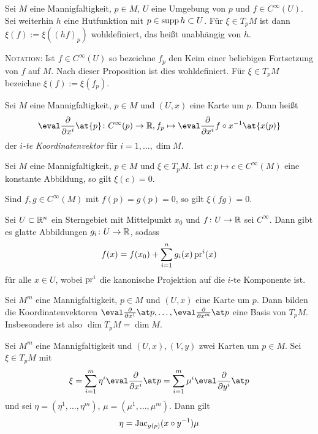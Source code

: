 \begin{proposition}
  Sei $M$ eine Mannigfaltigkeit, $p\in M$, $U$ eine Umgebung von $p$
  und $f\in C^\infty(U)$. Sei weiterhin $h$ eine Hutfunktion mit $p
  \in \operatorname{supp} h \subset U$. Für $\xi \in T_pM$ ist dann $\xi(f) := \xi((hf)_p)$
  wohldefiniert, das heißt unabhängig von $h$.

  \textsc{Notation:} Ist $f\in C^\infty(U)$ so bezeichne $f_p$ den
  Keim einer beliebigen Fortsetzung von $f$ auf $M$. Nach dieser
  Proposition ist dies wohldefiniert. Für $\xi \in T_pM$ bezeichne $\xi(f) := \xi(f_p)$.
\end{proposition}

\begin{definition}
  Sei $M$ eine Mannigfaltigkeit, $p\in M$ und $(U,x)$ eine Karte um
  $p$. Dann heißt
  \begin{equation*}
    \eval \deldelxi \at{p}\colon C^\infty(p) \to \R, f_p \mapsto \eval
    \deldelxi f\circ x^{-1}\at{x(p)}
  \end{equation*}
  der \emph{$i$-te Koordinatenvektor} für $i = 1,\dots,\dim M$.
\end{definition}

\begin{proposition}
  Sei $M$ eine Mannigfaltigkeit, $p\in M$ und $\xi \in T_pM$. Ist
  $c\colon p \mapsto c \in C^\infty(M)$ eine konstante Abbildung, so
  gilt $\xi(c) = 0$.

  Sind $f,g\in C^\infty(M)$ mit $f(p) = g(p) = 0$, so gilt $\xi(fg) = 0$.
\end{proposition}

\begin{lemma}
  Sei $U\subset \mathbb{R}^n$ ein Sterngebiet mit Mittelpunkt $x_0$ und
  $f\colon U \to \mathbb{R}$ sei $C^\infty$. Dann gibt es glatte Abbildungen
  $g_i \colon U \to \mathbb{R}$, sodass
  \begin{equation*}
    f(x) = f(x_0) + \sum_{i=1}^n g_i(x) \operatorname{pr}^i(x)
  \end{equation*}
  für alle $x\in U$, wobei $\operatorname{pr}^i$ die kanonische Projektion auf die
  $i$-te Komponente ist.
\end{lemma}

\begin{proposition}
  Sei $M^m$ eine Mannigfaltigkeit, $p\in M$ und $(U,x)$ eine Karte um
  $p$. Dann bilden die Koordinatenvektoren $\kvecxi[1],\dots,\kvecxi[m]$
  eine Basis von $T_pM$. Insbesondere ist also $\dim T_pM = \dim M$.
\end{proposition}

\begin{proposition}
  Sei $M^m$ eine Mannigfaltigkeit und $(U,x),(V,y)$ zwei Karten um $p\in
  M$. Sei $\xi \in T_pM$ mit
  \begin{equation*}
    \xi = \sum_{i=1}^m \eta^i \kvecxi = \sum_{i=1}^m \mu^i \kvecyi
  \end{equation*}
  und sei $\eta = (\eta^1,\dots,\eta^m)$, $\mu =
  (\mu^1,\dots,\mu^m)$. Dann gilt
  \begin{equation*}
    \eta = \operatorname{Jac}_{y(p)}(x\circ y^{-1})\mu
  \end{equation*}
\end{proposition}


